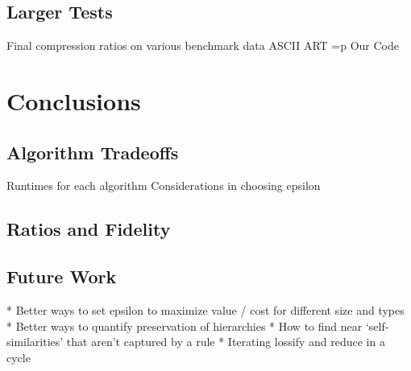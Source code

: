 \documentclass[11pt]{article}
\begin{document}
\begin{table}[t]



\caption{Reducer Tests for $\epsilon = .2$}
\end{table}


\subsection{Larger Tests}
Final compression ratios on various benchmark data
ASCII ART =p
Our Code

\section{Conclusions}
\subsection{Algorithm Tradeoffs}
Runtimes for each algorithm
Considerations in choosing epsilon
\subsection{Ratios and Fidelity}
\subsection{Future Work}
* Better ways to set epsilon to maximize value / cost for different size and types
* Better ways to quantify preservation of hierarchies
* How to find near `self-similarities' that aren't captured by a rule
* Iterating lossify and reduce in a cycle

\nocite{*}


\end{document}
